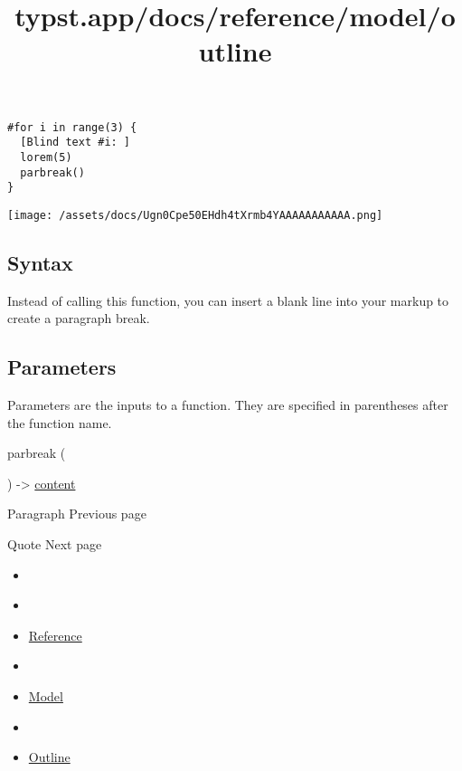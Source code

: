 \begin{verbatim}
#for i in range(3) {
  [Blind text #i: ]
  lorem(5)
  parbreak()
}
\end{verbatim}

\texttt{[image: /assets/docs/Ugn0Cpe50EHdh4tXrmb4YAAAAAAAAAAA.png]}

\subsection{Syntax}\label{syntax}

Instead of calling this function, you can insert a blank line into your
markup to create a paragraph break.

\subsection{\texorpdfstring{{ Parameters
}}{ Parameters }}\label{parameters}

\label{parameters-tooltip}
Parameters are the inputs to a function. They are specified in
parentheses after the function name.

{ parbreak } (

) -\textgreater{} \href{/docs/reference/foundations/content/}{content}

\href{/docs/reference/model/par/}{\pandocbounded{}}

{ Paragraph } { Previous page }

\href{/docs/reference/model/quote/}{\pandocbounded{}}

{ Quote } { Next page }


\title{typst.app/docs/reference/model/outline}

\begin{itemize}
\tightlist
\item
  \href{/docs}{}
\item
  
\item
  \href{/docs/reference/}{Reference}
\item
  
\item
  \href{/docs/reference/model/}{Model}
\item
  
\item
  \href{/docs/reference/model/outline/}{Outline}
\end{itemize}

